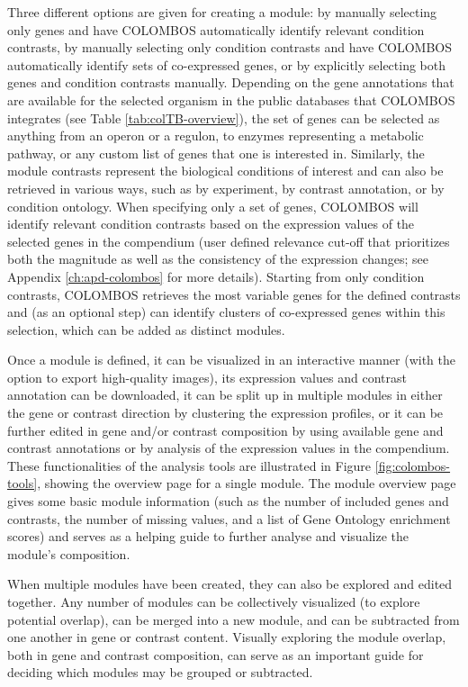 Three different options are given for creating a module: by manually selecting 
only genes and have COLOMBOS automatically identify relevant condition 
contrasts, by manually selecting only condition contrasts and have COLOMBOS 
automatically identify sets of co-expressed genes, or by explicitly selecting 
both genes and condition contrasts manually. Depending on the gene annotations 
that are available for the selected organism in the public databases that 
COLOMBOS integrates (see Table \ref{tab:colTB-overview}), the set of genes can 
be selected as anything from an operon or a regulon, to enzymes representing a 
metabolic pathway, or any custom list of genes that one is interested in. 
Similarly, the module contrasts represent the biological conditions of interest 
and can also be retrieved in various ways, such as by experiment, by contrast 
annotation, or by condition ontology. When specifying only a set of genes, 
COLOMBOS will identify relevant condition contrasts based on the expression 
values of the selected genes in the compendium (user defined relevance cut-off 
that prioritizes both the magnitude as well as the consistency of the 
expression changes; see Appendix \ref{ch:apd-colombos} for more details). 
Starting from only condition contrasts, COLOMBOS retrieves the most variable 
genes for the defined contrasts and (as an optional step) can identify clusters 
of co-expressed genes within this selection, which can be added as distinct 
modules.

Once a module is defined, it can be visualized in an interactive manner (with 
the option to export high-quality images), its expression values and contrast 
annotation can be downloaded, it can be split up in multiple modules in either 
the gene or contrast direction by clustering the expression profiles, or it can 
be further edited in gene and/or contrast composition by using available gene 
and contrast annotations or by analysis of the expression values in the 
compendium. These functionalities of the analysis tools are illustrated in 
Figure \ref{fig:colombos-tools}, showing the overview page for a single module. 
The module overview page gives some basic module information (such as the 
number of included genes and contrasts, the number of missing values, and a 
list of Gene Ontology enrichment scores) and serves as a helping guide to 
further analyse and visualize the module's composition.

When multiple modules have been created, they can also be explored and edited 
together. Any number of modules can be collectively visualized (to explore 
potential overlap), can be merged into a new module, and can be subtracted from 
one another in gene or contrast content. Visually exploring the module overlap, 
both in gene and contrast composition, can serve as an important guide for 
deciding which modules may be grouped or subtracted.

